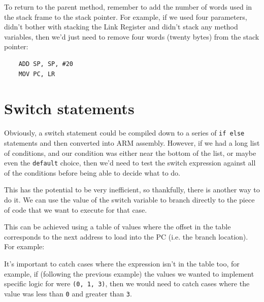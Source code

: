 To return to the parent method, remember to add the number of words used in the
stack frame to the stack pointer. For example, if we used four parameters,
didn't bother with stacking the Link Register and didn't stack any method
variables, then we'd just need to remove four words (twenty bytes) from the
stack pointer:

\begin{verbatim}
	ADD	SP, SP, #20
	MOV PC, LR
\end{verbatim}

\section{Switch statements}
\label{sec:switch}
Obviously, a switch statement could be compiled down to a series of {\tt if
else} statements and then converted into ARM assembly. However, if we had a long
list of conditions, and our condition was either near the bottom of the list, or
maybe even the {\tt default} choice, then we'd need to test the switch
expression against all of the conditions before being able to decide what to do.

This has the potential to be very inefficient, so thankfully, there is another
way to do it. We can use the value of the switch variable to branch directly to
the piece of code that we want to execute for that case.

This can be achieved using a table of values where the offset in the table
corresponds to the next address to load into the PC (i.e. the branch location).
For example:



It's important to catch cases where the expression isn't in the table too, for
example, if (following the previous example) the values we wanted to implement
specific logic for were {\tt (0, 1, 3)}, then we would need to catch cases where
the value was less than {\tt 0} and greater than {\tt 3}.

